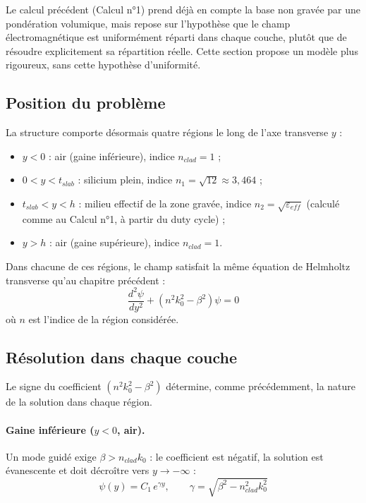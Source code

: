 \documentclass[a4paper,11pt]{report}
\begin{document}
Le calcul précédent (Calcul n°1) prend déjà en compte la base non gravée par une pondération volumique, mais repose sur l'hypothèse que le champ électromagnétique est uniformément réparti dans chaque couche, plutôt que de résoudre explicitement sa répartition réelle. Cette section propose un modèle plus rigoureux, sans cette hypothèse d'uniformité.

\subsection*{Position du problème}

La structure comporte désormais quatre régions le long de l'axe transverse $y$ :
\begin{itemize}
    \item $y<0$ : air (gaine inférieure), indice $n_{clad}=1$ ;
    \item $0<y<t_{slab}$ : silicium plein, indice $n_1=\sqrt{12}\approx3{,}464$ ;
    \item $t_{slab}<y<h$ : milieu effectif de la zone gravée, indice $n_2=\sqrt{\varepsilon_{eff}}$ (calculé comme au Calcul n°1, à partir du duty cycle) ;
    \item $y>h$ : air (gaine supérieure), indice $n_{clad}=1$.
\end{itemize}

Dans chacune de ces régions, le champ satisfait la même équation de Helmholtz transverse qu'au chapitre précédent :
\begin{equation}
\frac{d^2\psi}{dy^2} + \left(n^2k_0^2-\beta^2\right)\psi = 0
\label{eq:helmholtz_multicouche}
\end{equation}
où $n$ est l'indice de la région considérée.

\subsection*{Résolution dans chaque couche}

Le signe du coefficient $(n^2k_0^2-\beta^2)$ détermine, comme précédemment, la nature de la solution dans chaque région.

\paragraph{Gaine inférieure ($y<0$, air).} Un mode guidé exige $\beta>n_{clad}k_0$ : le coefficient est négatif, la solution est évanescente et doit décroître vers $y\to-\infty$ :
\begin{equation}
\psi(y) = C_1\,e^{\gamma y}, \qquad \gamma = \sqrt{\beta^2-n_{clad}^2k_0^2}
\end{equation}
\end{document}
